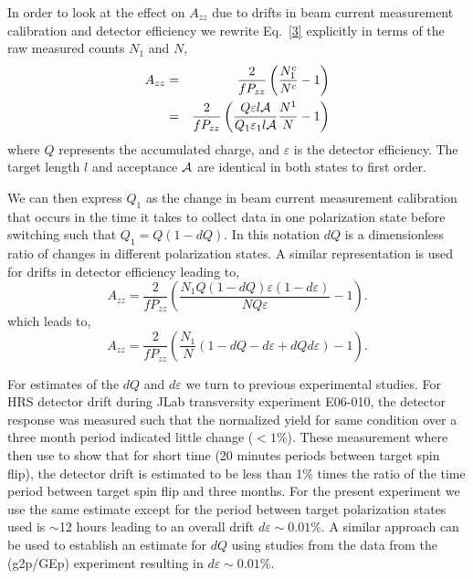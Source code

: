 In order to look at the effect on $A_{zz}$ due to drifts in beam current measurement
calibration and detector efficiency 
we rewrite Eq.~\ref{3} explicitly in terms of the raw measured counts $N_1$ and $N$,
\begin{eqnarray} \label{3c}
\nonumber
A_{zz}&=&\frac{2}{fP_{zz}}\left(\frac{N^c_1}{N^c}-1\right) \\
      &=&\frac{2}{fP_{zz}}\left(\frac{Q\varepsilon l \cal{A}}{Q_1\varepsilon_1 l \cal{A}}\frac{N^1}{N}-1\right)
\end{eqnarray}
where $Q$ represents the accumulated charge, and $\varepsilon$ is the detector efficiency. The target length $l$  and acceptance $\cal{A}$ are identical in both states to first order.

We can then express $Q_1$ as the change in beam current measurement calibration that occurs in
the time it takes to collect data in one polarization state before switching such that $Q_1=Q(1-dQ)$.
In this notation $dQ$ is a dimensionless ratio of changes in different polarization states.  A similar representation
is used for drifts in detector efficiency leading to,
\begin{equation}
A_{zz}=\frac{2}{fP_{zz}}\left(\frac{N_1Q(1-dQ)\varepsilon(1-d\varepsilon)}{NQ\varepsilon}-1\right).
\end{equation}
which leads to,
\begin{equation}
A_{zz}=\frac{2}{fP_{zz}}\left(\frac{N_1}{N}(1-dQ-d\varepsilon+dQd\varepsilon)-1\right).
\end{equation}

For estimates of the $dQ$ and $d\varepsilon$ we turn to previous experimental
studies.  For HRS detector drift during JLab transversity experiment E06-010, the detector response
was measured such that the normalized yield for same condition over a three month period indicated little change ($<1$\%).
These measurement where then use to show that for short time (20 minutes periods between target spin flip),
the detector drift is estimated to be less than 1\% times the ratio of the time period between target spin flip and three months.
For the present experiment we use the same estimate except for the period between target polarization states used is
$\sim$12 hours leading to an overall drift $d\varepsilon\sim0.01\%$.  A similar approach can be used to establish an estimate
for $dQ$ using studies from the data from the (g2p/GEp) experiment resulting in $d\varepsilon\sim0.01\%$.

